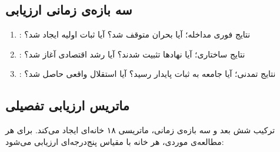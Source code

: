 \subsection{سه بازه‌ی زمانی ارزیابی}
\label{subsec:ch04-timeframes}

\begin{tcolorbox}[defbox,
	title={سه بازه‌ی زمانی ارزیابی}]
	\begin{enumerate}[label=\textbf{\arabic*.}, nosep, rightmargin=1em]
		\item {}: نتایج فوری مداخله؛
		آیا بحران متوقف شد؟ آیا ثبات اولیه ایجاد شد؟
		\item {}: نتایج ساختاری؛ آیا
		نهادها تثبیت شدند؟ آیا رشد اقتصادی آغاز شد؟
		\item {}: نتایج تمدنی؛ آیا
		جامعه به ثبات پایدار رسید؟ آیا استقلال واقعی حاصل شد؟
	\end{enumerate}
\end{tcolorbox}

\subsection{ماتریس ارزیابی تفصیلی}
\label{subsec:ch04-full-matrix}

ترکیب شش بعد و سه بازه‌ی زمانی، ماتریسی ۱۸ خانه‌ای ایجاد
می‌کند. برای هر مطالعه‌ی موردی، هر خانه با مقیاس پنج‌درجه‌ای
ارزیابی می‌شود:

